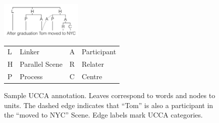 \documentclass[11pt,letterpaper]{article}
\begin{document}
%


\begin{figure}
    \begin{center}
    \includegraphics[width=0.35\textwidth]{ucca-tree-v2.png}

{\small
  \begin{tabular}{|l|l|l|l|}
\hline
L & Linker &  A & Participant \\
H & Parallel Scene & R & Relater \\
P & Process & C & Centre \\
\hline
\end{tabular}
}
    \end{center}
\caption{\label{fig:ucca_example_v2}
  Sample UCCA annotation. Leaves correspond to words and nodes to units.
  The dashed edge indicates that ``Tom'' is also a participant in the ``moved to NYC''
  Scene. Edge labels mark UCCA categories.}
\end{figure}
\end{document}
